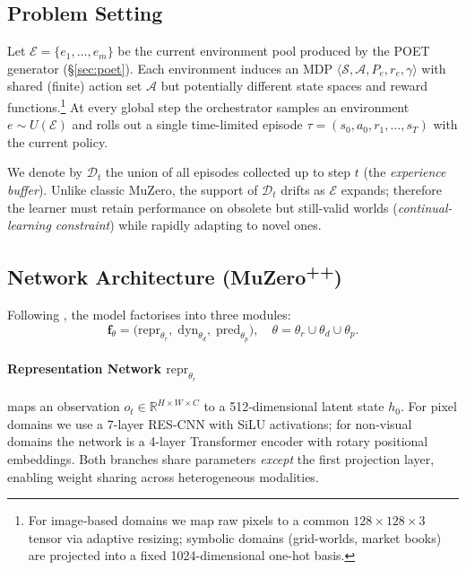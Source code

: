 \subsection{Problem Setting}

Let $\mathcal E=\{e_1,\dots,e_m\}$ be the current environment pool produced by
the POET generator (§\ref{sec:poet}).  Each environment induces an MDP
$\langle\mathcal S,\mathcal A,P_e,r_e,\gamma\rangle$ with shared (finite)
action set $\mathcal A$ but potentially different state spaces and reward
functions.\footnote{For image‐based domains we map raw pixels to a common
$128\times128\times3$ tensor via adaptive resizing; symbolic domains
(grid-worlds, market books) are projected into a fixed 1024-dimensional
one-hot basis.}  At every global step the orchestrator samples an environment
$e\sim U(\mathcal E)$ and rolls out a single time-limited episode
$\tau=(s_0,a_0,r_1,\dots,s_T)$ with the current policy.

We denote by $\mathcal D_t$ the union of all episodes collected up to step $t$
(the \emph{experience buffer}).  Unlike classic MuZero, the support of
$\mathcal D_t$ drifts as $\mathcal E$ expands; therefore the learner must
retain performance on obsolete but still-valid worlds
(\emph{continual-learning constraint}) while rapidly adapting to novel ones.

\subsection{Network Architecture (MuZero\textsuperscript{++})}

Following \textcite{schrittwieser2019muzero}, the model factorises into three
modules:
\[
\mathbf f_\theta
=\bigl(\mathrm{repr}_{\theta_r},\;
        \mathrm{dyn}_{\theta_d},\;
        \mathrm{pred}_{\theta_p}\bigr),
\quad
\theta=\theta_r\cup\theta_d\cup\theta_p .
\]

\paragraph{Representation Network $\mathrm{repr}_{\theta_r}$}
maps an observation $o_t\in\mathbb R^{H\times W\times C}$ to a 512‐dimensional
latent state $h_0$.  For pixel domains we use a 7-layer RES-CNN with
SiLU activations; for non-visual domains the network is a 4-layer Transformer
encoder with rotary positional embeddings.  Both branches share parameters
\emph{except} the first projection layer, enabling weight sharing across
heterogeneous modalities.

